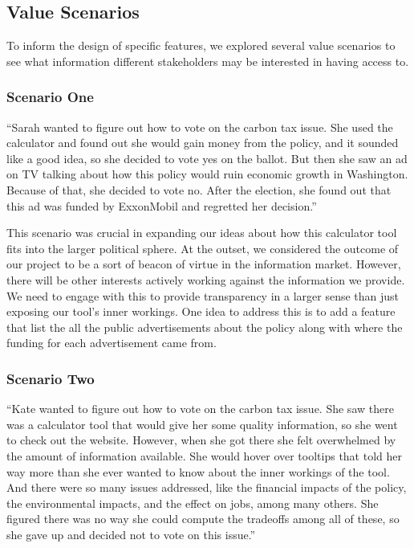 \documentclass{sigchi}
\begin{document}
\subsection{Value Scenarios}
To inform the design of specific features, we explored several value scenarios 
to see what information different stakeholders may be interested in having access to. 
\subsubsection{Scenario One}
``Sarah wanted to figure out how to vote on the carbon tax issue. She used the calculator and found out she would gain money from the policy, and it sounded like a good idea, so she decided to vote yes on the ballot. But then she saw an ad on TV talking about how this policy would ruin economic growth in Washington. Because of that, she decided to vote no. After the election, she found out that this ad was funded by ExxonMobil and regretted her decision.''

This scenario was crucial in expanding our ideas about how this calculator tool fits into the larger 
political sphere. At the outset, we considered the outcome of our project to be a sort of beacon of 
virtue in the information market. However, there will be other interests actively working 
against the information we provide. We need to engage with this to provide transparency in a larger 
sense than just exposing our tool's inner workings. One idea to address this is to add a feature 
that list the all the public advertisements about the policy along with where the funding for each 
advertisement came from. 

\subsubsection{Scenario Two}
``Kate wanted to figure out how to vote on the carbon tax issue. She saw there was a calculator tool that would give her 
some quality information, so she went to check out the website. However, when she got there she felt overwhelmed by the amount 
of information available. She would hover over tooltips that told her way more than she ever wanted to know about the inner workings 
of the tool. 
And there were so many issues addressed, like the financial impacts of the policy, the environmental impacts, and 
the effect on jobs, among many others. She figured there was no way she could compute the tradeoffs among all of these, 
so she gave up and decided not to vote on this issue.''
\end{document}
